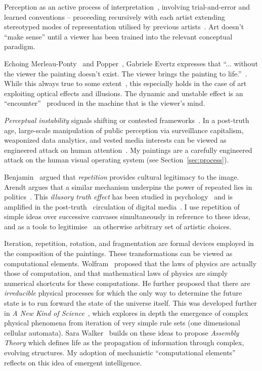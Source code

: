 \documentclass[12pt]{article}
\begin{document}
Perception as an active process of interpretation~\cite{popper1972objective}, involving trial-and-error and learned conventions -- proceeding recursively with each artist extending stereotyped modes of representation utilised by previous artists~\cite{gombrich1960art}.  Art doesn't ``make sense'' until a viewer has been trained into the relevant conceptual paradigm.

Echoing Merleau-Ponty~\cite{merleauPonty1962phenomenology} and Popper~\cite{popper1972objective}, Gabriele Evertz expresses that ``... without the viewer the painting doesn't exist. The viewer brings the painting to life.''~\cite{evertz09documentary}. While this always true to some extent~\cite{barthes1977death}, this especially holds in the case of art exploiting optical effects and illusions. The dynamic and unstable effect is an ``encounter''~\cite{encounter} produced in the machine that is the viewer's mind. 

\emph{Perceptual instability} signals shifting or contested frameworks~\cite{kuhn1970structure}. In a post-truth~\cite{keyes2004posttruth,mcintyre2018posttruth} age, large-scale manipulation of public perception via surveillance capitalism, weaponized data analytics, and vested media interests can be viewed as engineered attack on human attention~\cite{zuboff2019surveillance, steyerl2016sea}. My paintings are a carefully engineered attack on the human visual operating system (see Section~\ref{sec:process}). 

Benjamin~\cite{benjamin1935kunstwerk} argued that \emph{repetition} provides cultural legitimacy to the image. Arendt argues that a similar mechanism underpins the  power of repeated lies in politics~\cite{arendt1972lying}. This \emph{illusory truth effect} has been studied in psychology~\cite{hasher1977frequency} and is amplified in the post-truth~\cite{keyes2004posttruth,mcintyre2018posttruth} circulation of digital media~\cite{zuboff2019surveillance}. I use repetition of simple ideas over successive canvases simultaneously in reference to these ideas, and as a tools to legitimise~\cite{foster1996return,neely-repetition} an otherwise arbitrary set of artistic choices. 

Iteration, repetition, rotation, and fragmentation are formal devices employed in the composition of the paintings. These transformations can be viewed as computational elements. Wolfram~\cite{wolfram1984} proposed that the laws of physics are actually those of computation, and that mathematical laws of physics are simply numerical shortcuts for these computations. He further proposed that there are \emph{irreducible} physical processes for which the only way to determine the future state is to run forward the state of the universe itself. This was developed further in \emph{A New Kind of Science}~\cite{wolfram}, which explores in depth the emergence of complex physical phenomena from iteration of very simple rule sets (one dimensional cellular automata). Sara Walker~\cite{walker2024life} builds on these ideas to propose \emph{Assembly Theory} which defines life as the propagation of information through complex, evolving structures. My adoption of mechanistic ``computational elements'' reflects on this idea of emergent intelligence.
\end{document}
